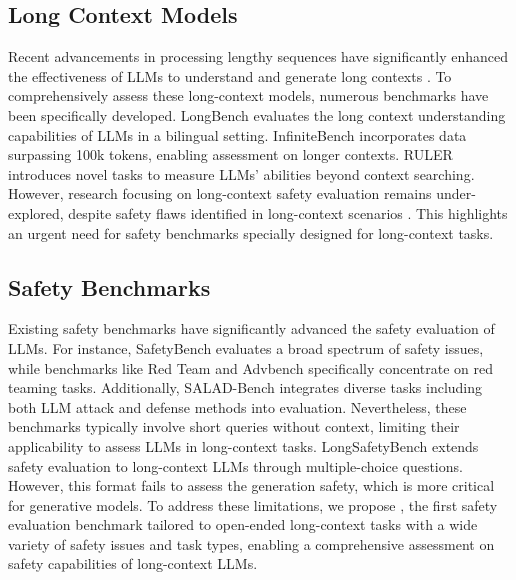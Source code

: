 \subsection{Long Context Models}



Recent advancements in processing lengthy sequences \cite{sun2023length, su2024roformer, DBLP:conf/iclr/XiaoTCHL24, DBLP:conf/iclr/ChenQTLL0J24} have significantly enhanced the effectiveness of LLMs to understand and generate long contexts \cite{achiam2023gpt, glm2024chatglm}. To comprehensively assess these long-context models, numerous benchmarks have been specifically developed. LongBench \cite{bai2024longbench} evaluates the long context understanding capabilities of LLMs in a bilingual setting. InfiniteBench \cite{zhang2024bench} incorporates data surpassing 100k tokens, enabling assessment on longer contexts. RULER \cite{hsieh2024ruler} introduces novel tasks to measure LLMs' abilities beyond context searching. However, research focusing on long-context safety evaluation remains under-explored, despite safety flaws identified in long-context scenarios \cite{anil2024many, upadhayay2024cognitive}. This highlights an urgent need for safety benchmarks specially designed for long-context tasks.


\subsection{Safety Benchmarks}


Existing safety benchmarks have significantly advanced the safety evaluation of LLMs. For instance, SafetyBench \cite{zhang2023safetybench} evaluates a broad spectrum of safety issues, while benchmarks like Red Team \cite{ganguli2022red} and Advbench \cite{zou2023universal} specifically concentrate on red teaming tasks. Additionally, SALAD-Bench \cite{li-etal-2024-salad} integrates diverse tasks including both LLM attack and defense methods into evaluation. Nevertheless, these benchmarks typically involve short queries without context, limiting their applicability to assess LLMs in long-context tasks. LongSafetyBench \cite{huang2024longsafetybench} extends safety evaluation to long-context LLMs through multiple-choice questions. However, this format fails to assess the generation safety, which is more critical for generative models. To address these limitations, we propose \benchmark, the first safety evaluation benchmark tailored to open-ended long-context tasks with a wide variety of safety issues and task types, enabling a comprehensive assessment on safety capabilities of long-context LLMs.